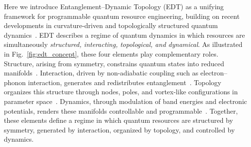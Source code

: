 \documentclass[twocolumn,10pt]{article}
\begin{document}




Here we introduce Entanglement–Dynamic Topology (EDT) as a unifying framework for programmable quantum resource engineering, building on recent developments in curvature-driven and topologically structured quantum dynamics~\cite{Hu2024_ACP,Hu2025_APQ,Hu2026_JPCM}. EDT describes a regime of quantum dynamics in which resources are simultaneously \emph{structured, interacting, topological, and dynamical}. As illustrated in Fig.~\ref{fig:edt_concept}, these four elements play complementary roles. Structure, arising from symmetry, constrains quantum states into reduced manifolds~\cite{Wigner1959,Georgi1999}. Interaction, driven by non-adiabatic coupling such as electron–phonon interaction, generates and redistributes entanglement~\cite{Mead1979,Yarkony1996}. Topology organizes this structure through nodes, poles, and vortex-like configurations in parameter space~\cite{Berry1984,Xiao2010}. Dynamics, through modulation of band energies and electronic potentials, renders these manifolds controllable and programmable~\cite{Bukov2015,Eckardt2017}. Together, these elements define a regime in which quantum resources are structured by symmetry, generated by interaction, organized by topology, and controlled by dynamics.
\end{document}
